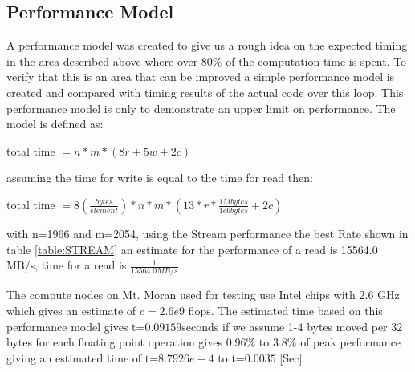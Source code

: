 \documentclass[]{article}%
\begin{document}


%
%
%
%
%
%
%


\subsection{Performance Model}

A performance model was created to give us a rough idea on the expected timing in the area described above where over 80\% of the computation time is spent. To verify that this is an area that can be improved a simple performance model is created and compared with timing results of the actual code over this loop. This performance model is only to demonstrate an upper limit on performance. The model is defined as:

total time $=n*m*(8r+5w+2c)$

assuming the time for write is equal to the time for read then:

total time $=8 (\frac{bytes}{element})*n*m*(13*r*\frac{1Mbytes}{1e6 bytes} + 2c)$

with n=1966 and m=2054, using the Stream performance the best Rate shown in table \ref{table:STREAM} an estimate for the performance of a read is 15564.0 MB/s, time for a read is $\frac{1}{15564.0 MB/s}$


The compute nodes on Mt. Moran used for testing use Intel chips with 2.6 GHz which gives an estimate of $c=2.6e9$ flops. The estimated time based on this performance model gives t=$  0.09159 $seconds if we assume 1-4 bytes moved per 32 bytes for each floating point operation gives 0.96\% to 3.8\% of peak performance giving an estimated time  of t=$8.7926e-4$ to  t=$0.0035$ [Sec]
\end{document}
